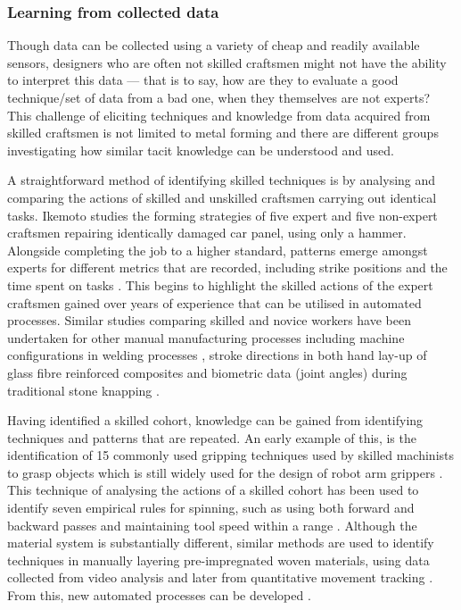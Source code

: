 \subsubsection{Learning from collected data}
Though data can be collected using a variety of cheap and readily available sensors, designers who are often not skilled craftsmen might not have the ability to interpret this data --- that is to say, how are they to evaluate a good technique/set of data from a bad one, when they themselves are not experts? 
This challenge of eliciting techniques and knowledge from data acquired from skilled craftsmen is not limited to metal forming and there are different groups investigating how similar tacit knowledge can be understood and used.

A straightforward method of identifying skilled techniques is by analysing and comparing the actions of skilled and unskilled craftsmen carrying out identical tasks. Ikemoto studies the forming strategies of five expert and five non-expert craftsmen repairing identically damaged car panel, using only a hammer.  Alongside completing the job to a higher standard, patterns emerge amongst experts for different metrics that are recorded, including strike positions \citep{Ikemoto2018ProcessRepair} and the time spent on tasks \citep{Ikemoto2016ARepair}. This begins to highlight the skilled actions of the expert craftsmen gained over years of experience that can be utilised in automated processes. Similar studies comparing skilled and novice workers have been undertaken for other manual manufacturing processes including machine configurations in welding processes \citep{Manorathna2017HumanAutomation}, stroke directions in both hand lay-up of glass fibre reinforced composites \citep{Xie2016EffectMethod, Kikuchi2016ResearchLay-up} and biometric data (joint angles) during traditional stone knapping \citep{Rein2014MovementTraditions}. 

Having identified a skilled cohort, knowledge can be gained from identifying techniques and patterns that are repeated. An early example of this, is the identification of 15 commonly used gripping techniques used by skilled machinists to grasp objects \citep{Cutkosky1986ModellingHands} which is still widely used for the design of robot arm grippers \citep{Feix2016TheTypes}. This technique of analysing the actions of a skilled cohort has been used to identify seven empirical rules for spinning, such as using both forward and backward passes and maintaining tool speed within a range \citep{Russo2020ResearchSpinning}.
Although the material system is substantially different, similar methods are used to identify techniques in manually layering pre-impregnated woven materials, using data collected from video analysis \citep{Elkington2015HandProcess, Elkington2015StudyingLayup} and later from quantitative movement tracking \citep{Prabhu2017DigitisationTechnology}. From this, new automated processes can be developed \citep{Elkington2016AutomatedMoulds}.

